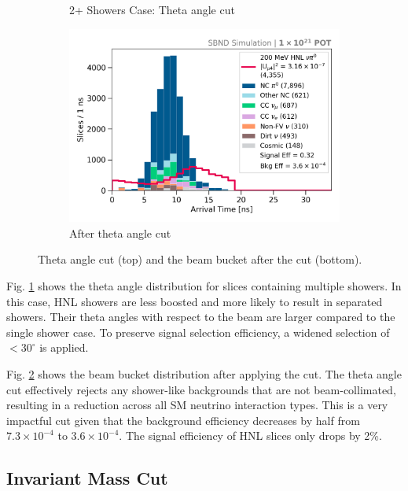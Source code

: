 \begin{figure}[bp!]
\begin{subfigure}[b]{0.495\textwidth}
            \caption{2+ Showers Case: Theta angle cut}%
	    \label{fig:2shw_theta_cut}
        \end{subfigure}
        \hfill
	\centering
        \begin{subfigure}[b]{0.495\textwidth}   
            \centering 
            \includegraphics[width=\textwidth]{beam_bucket_postshowertheta}
            \caption{After theta angle cut}%
	    \label{fig:bb_theta}
        \end{subfigure}
	\caption[Theta Angle Cut]{
		Theta angle cut (top) and the beam bucket after the cut (bottom). 
	}
        \label{fig:theta_cut}
\end{figure}

Fig. \ref{fig:2shw_theta_cut} shows the theta angle distribution for slices containing multiple showers.
In this case, HNL showers are less boosted and more likely to result in separated showers.
Their theta angles with respect to the beam are larger compared to the single shower case.
To preserve signal selection efficiency, a widened selection of $< 30^{\circ}$ is applied.


Fig. \ref{fig:bb_theta} shows the beam bucket distribution after applying the cut.
The theta angle cut effectively rejects any shower-like backgrounds that are not beam-collimated, resulting in a reduction across all SM neutrino interaction types.
This is a very impactful cut given that the background efficiency decreases by half from $7.3 \times 10^{-4}$ to $3.6 \times 10^{-4}$.
The signal efficiency of HNL slices only drops by 2\%.



\subsection{Invariant Mass Cut}
\label{sec:mass_cut}


